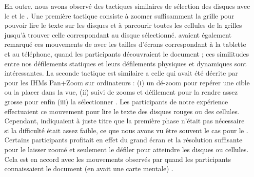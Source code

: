 
En outre, nous avons observé des tactiques similaires de sélection des disques avec le  et le . Une première tactique consiste à zoomer suffisamment la grille pour pouvoir lire le texte sur les disques et à parcourir toutes les cellules de la grilles jusqu'à trouver celle correspondant au disque sélectionné. \cite{Raedle2014} avaient également remarqué ces mouvements de   avec les tailles d'écrans correspondant à la tablette et au téléphone, quand les participants découvraient le document ; ces similitudes entre nos défilements statiques et leurs défilements physiques et dynamiques sont intéressantes. La seconde tactique est similaire a celle qui avait été décrite par \cite{Guiard2004} pour les IHMs Pan+Zoom sur ordinateurs : (i) un dé-zoom pour repérer une cible ou la placer dans la vue, (ii) suivi de zooms et défilement pour la rendre assez grosse pour enfin (iii) la sélectionner . Les participants de notre expérience effectuaient ce mouvement pour lire le texte des disques rouges ou des cellules. Cependant, \cite{Guiard2004} indiquaient à juste titre que la première phase n'était pas nécessaire si la difficulté était assez faible, ce que nous avons vu être souvent le cas pour le . Certains participants profitait en effet du grand écran et la résolution suffisante pour le laisser zoomé et seulement le défiler pour atteindre les disques ou cellules. Cela est en accord avec les mouvements observés par \cite{Raedle2014} quand les participants connaissaient le document (en avait une carte mentale) .



